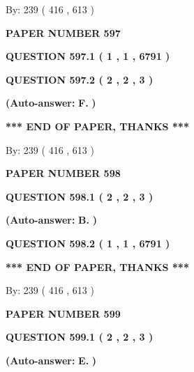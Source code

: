 \documentclass[12pt]{article}
\begin{document}
   
\hspace{1.0in} By: 
 239 ( 416 ,  613 )
   
   
   
   
\newpage 
\setcounter{page}{ 
   597001 } 
   
   
 {\textbf{ \Large{ PAPER NUMBER  597  }}}
   
   
   
   
  
  
{\textbf{\large{QUESTION
597.1 
 ( 1 , 1 , 6791 )
}}}
  
  
{\textbf{\large{QUESTION
597.2 
 ( 2 , 2 , 3 )
}}}
 
 
{\textbf{(Auto-answer:}}
{\textbf{\large{
F.}}}
{\textbf{)}}
 
 
   
   
   
   
\vspace{1.0in} 
{\textbf{\large{ *** END OF PAPER, THANKS *** }}} 
   
   
\hspace{1.0in} By: 
 239 ( 416 ,  613 )
   
   
   
   
\newpage 
\setcounter{page}{ 
   598001 } 
   
   
 {\textbf{ \Large{ PAPER NUMBER  598  }}}
   
   
   
   
  
  
{\textbf{\large{QUESTION
598.1 
 ( 2 , 2 , 3 )
}}}
 
 
{\textbf{(Auto-answer:}}
{\textbf{\large{
B.}}}
{\textbf{)}}
 
 
  
  
{\textbf{\large{QUESTION
598.2 
 ( 1 , 1 , 6791 )
}}}
   
   
   
   
\vspace{1.0in} 
{\textbf{\large{ *** END OF PAPER, THANKS *** }}} 
   
   
\hspace{1.0in} By: 
 239 ( 416 ,  613 )
   
   
   
   
\newpage 
\setcounter{page}{ 
   599001 } 
   
   
 {\textbf{ \Large{ PAPER NUMBER  599  }}}
   
   
   
   
  
  
{\textbf{\large{QUESTION
599.1 
 ( 2 , 2 , 3 )
}}}
 
 
{\textbf{(Auto-answer:}}
{\textbf{\large{
E.}}}
{\textbf{)}}
 
\end{document}
